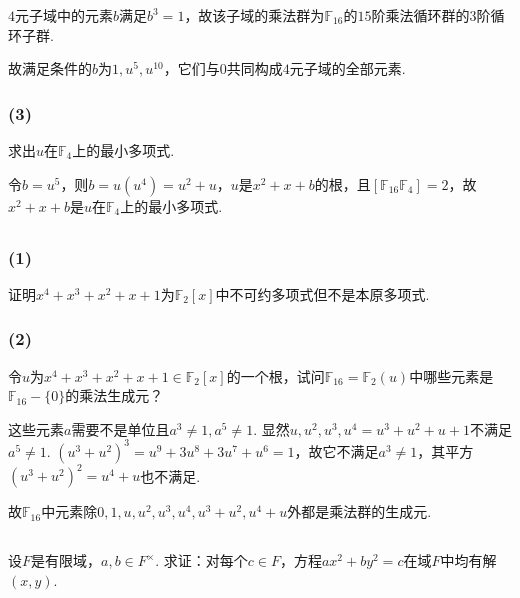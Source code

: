 \jie $4$元子域中的元素$b$满足$b^3=1$，故该子域的乘法群为$\mathbb{F}_16$的$15$阶乘法循环群的$3$阶循环子群.

故满足条件的$b$为$1,u^5,u^10$，它们与$0$共同构成$4$元子域的全部元素.

\subsubsection{(3)}
求出$u$在$\mathbb{F}_4$上的最小多项式.

\jie 令$b=u^5$，则$b=u(u^4)=u^2+u$，$u$是$x^2+x+b$的根，且$[\mathbb{F}_{16}\mathbb{F}_4]=2$，故$x^2+x+b$是$u$在$\mathbb{F}_4$上的最小多项式.

\subsection{}
\subsubsection{(1)}
证明$x^4+x^3+x^2+x+1$为$\mathbb{F}_2[x]$中不可约多项式但不是本原多项式.


\subsubsection{(2)}
令$u$为$x^4+x^3+x^2+x+1\in\mathbb{F}_2[x]$的一个根，试问$\mathbb{F}_{16}=\mathbb{F}_2(u)$中哪些元素是$\mathbb{F}_{16}-\{0\}$的乘法生成元？

\jie 这些元素$a$需要不是单位且$a^3\neq 1, a^5\neq 1$. 显然$u,u^2,u^3,u^4=u^3+u^2+u+1$不满足$a^5\neq 1$. $(u^3+u^2)^3=u^9+3u^8+3u^7+u^6=1$，故它不满足$a^3\neq 1$，其平方$(u^3+u^2)^2=u^4+u$也不满足.

故$\mathbb{F}_{16}$中元素除$0,1,u,u^2,u^3,u^4,u^3+u^2,u^4+u$外都是乘法群的生成元.

\subsection{}
设$F$是有限域，$a,b\in F^{\times}$. 求证：对每个$c\in F$，方程$ax^2+by^2=c$在域$F$中均有解$(x,y)$.


